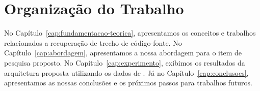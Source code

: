 \section{Organização do Trabalho}
\label{sec:organizacao_trabalho}

No Capítulo~\ref{cap:fundamentacao-teorica}, apresentamos os conceitos e trabalhos relacionados a recuperação de trecho de código-fonte. No Capítulo~\ref{cap:abordagem}, apresentamos a nossa abordagem para o item de pesquisa proposto. No Capítulo~\ref{cap:experimento}, exibimos os resultados da arquitetura proposta utilizando os dados de \cite{yao-2018}. Já no Capítulo~\ref{cap:conclusoes}, apresentamos as nossas conclusões e os próximos passos para trabalhos futuros.